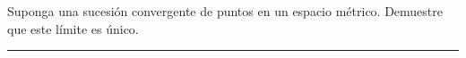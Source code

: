 %
%
\setcounter{isubsheet}{1}


\begin{ejercicio}
\item
  Suponga una sucesión convergente de puntos en un espacio métrico.
  Demuestre que este límite es único.

\medskip
{\color{gray}
\hrule
}



\end{ejercicio}
